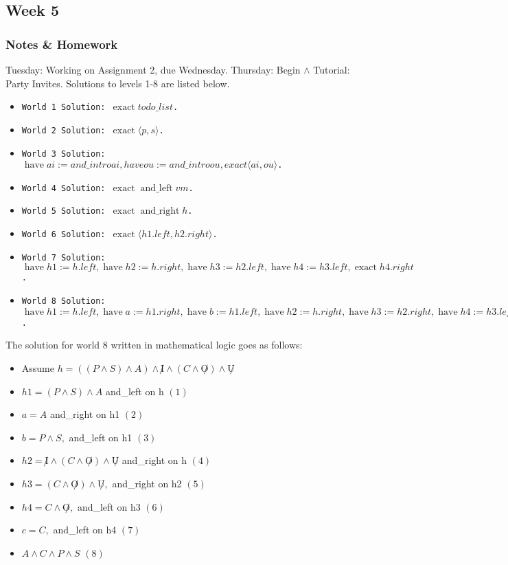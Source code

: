 \documentclass{article}
\DeclareMathOperator{\have}{have}
\DeclareMathOperator{\exact}{exact}
\DeclareMathOperator{\andLeft}{and\_left}
\DeclareMathOperator{\andRight}{and\_right}
\theoremstyle{theorem}
\theoremstyle{definition}
\theoremstyle{remark}
\begin{document}
\subsection{Week 5}

\subsubsection*{Notes \& Homework}
Tuesday: Working on Assignment 2, due Wednesday. 
Thursday: Begin $\wedge$ Tutorial: Party Invites. Solutions to levels 1-8 are listed below.

\begin{itemize}
  \item \texttt{World 1 Solution: $\exact todo\_list$.}
  \item \texttt{World 2 Solution: $\exact \langle p, s \rangle$.}
  \item \texttt{World 3 Solution: $\have ai := and\_intro a i, have ou := and\_intro o u, exact \langle ai, ou \rangle$.}
  \item \texttt{World 4 Solution: $\exact \andLeft vm$.}
  \item \texttt{World 5 Solution: $\exact \andRight h$.}
  \item \texttt{World 6 Solution: $\exact \langle h1.left, h2.right \rangle$.}
  \item \texttt{World 7 Solution: $\have h1 := h.left, \have h2 := h.right, \have h3 := h2.left, \have h4 := h3.left, \exact h4.right$.}
  \item \texttt{World 8 Solution: $\have h1 := h.left, \have a := h1.right, \have b := h1.left, \have h2 := h.right, \have h3 := h2.right, \have h4 := h3.left, \have c := h4.left, \exact \langle a, b, c\rangle$.}
\end{itemize}

The solution for world 8 written in mathematical logic goes as follows: 

\begin{itemize}
  \item Assume $h=((P \wedge S) \wedge A) \wedge \not I \wedge (C \wedge \not O) \wedge \not U$
  \item $h1 = (P \wedge S) \wedge A$ and\_left on h $(1)$
  \item $a = A$ and\_right on h1 $(2)$
  \item $b = P \wedge S, $ and\_left on h1 $(3)$ 
  \item $h2 = \not I \wedge (C \wedge \not O) \wedge \not U$ and\_right on h $(4)$
  \item $h3 = (C \wedge \not O) \wedge \not U, $ and\_right on h2 $(5)$
  \item $h4 = C \wedge \not O, $ and\_left on h3 $(6)$
  \item $c = C, $ and\_left on h4 $(7)$
  \item $A \wedge C \wedge P \wedge S$ $(8)$
\end{itemize}
\end{document}
